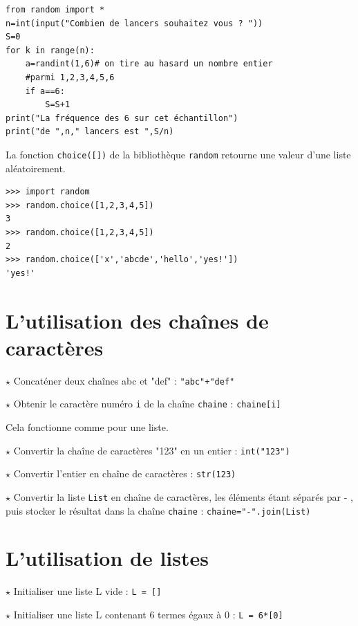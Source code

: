 \begin{lstlisting}
from random import *
n=int(input("Combien de lancers souhaitez vous ? "))
S=0
for k in range(n):
    a=randint(1,6)# on tire au hasard un nombre entier 
    #parmi 1,2,3,4,5,6
    if a==6:
        S=S+1
print("La fréquence des 6 sur cet échantillon")
print("de ",n," lancers est ",S/n)
\end{lstlisting}

La fonction \verb!choice([])! de la bibliothèque \verb!random! retourne une valeur d'une liste aléatoirement. 

\begin{lstlisting}
>>> import random
>>> random.choice([1,2,3,4,5])
3
>>> random.choice([1,2,3,4,5])
2
>>> random.choice(['x','abcde','hello','yes!'])
'yes!'
\end{lstlisting}

\section{L'utilisation des chaînes de caractères}

$\star$ Concaténer deux chaînes \og abc\fg{} et "def" : \verb~"abc"+"def"~

$\star$ Obtenir le caractère numéro \verb~i~ de la chaîne \verb~chaine~ : \verb~chaine[i]~

Cela fonctionne comme pour une liste.

$\star$ Convertir la chaîne de caractères "123" en un entier : \verb~int("123")~

$\star$ Convertir l'entier  \fg{}  en chaîne de caractères : \verb~str(123)~

$\star$ Convertir la liste \verb~List~ en chaîne de caractères, les éléments étant séparés par \og - \fg{}, puis stocker le résultat dans la chaîne \verb~chaine~ : \verb~chaine="-".join(List)~

\section{L'utilisation de listes}


$\star$ Initialiser une liste L vide : \verb!L = []!

$\star$ Initialiser une liste L contenant 6 termes égaux à 0 : \verb!L = 6*[0]!

